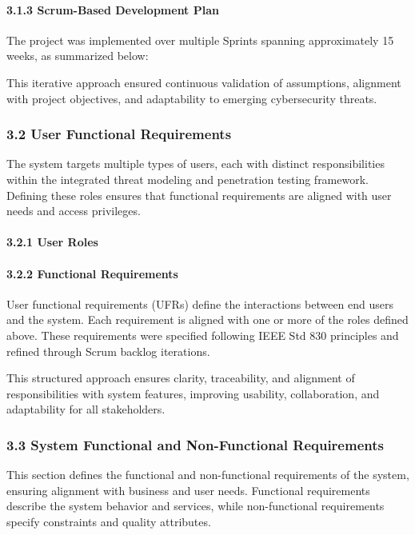 \documentclass[12pt,a4paper]{report}
\begin{document}
\paragraph{3.1.3 Scrum-Based Development Plan}

The project was implemented over multiple Sprints spanning approximately 15 weeks, as summarized below:

This iterative approach ensured continuous validation of assumptions, alignment with project objectives, and adaptability to emerging cybersecurity threats.

\subsubsection{3.2 User Functional Requirements}

The system targets multiple types of users, each with distinct responsibilities within the integrated threat modeling and penetration testing framework. Defining these roles ensures that functional requirements are aligned with user needs and access privileges.

\paragraph{3.2.1 User Roles}

\paragraph{3.2.2 Functional Requirements}

User functional requirements (UFRs) define the interactions between end users and the system. Each requirement is aligned with one or more of the roles defined above. These requirements were specified following IEEE Std 830 principles and refined through Scrum backlog iterations.

This structured approach ensures clarity, traceability, and alignment of responsibilities with system features, improving usability, collaboration, and adaptability for all stakeholders.

\subsubsection{3.3 System Functional and Non-Functional Requirements}

This section defines the functional and non-functional requirements of the system, ensuring alignment with business and user needs. Functional requirements describe the system behavior and services, while non-functional requirements specify constraints and quality attributes.
\end{document}
